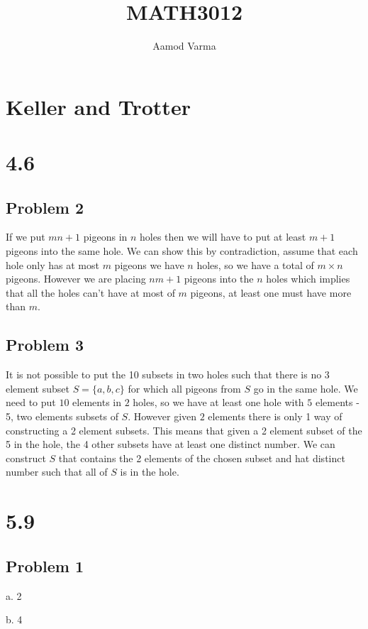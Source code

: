 \documentclass[a4paper]{report}
\title{MATH3012}
\author{Aamod Varma}
\begin{document}
\maketitle


\section*{Keller and Trotter}
\section*{4.6}
\subsection*{Problem 2}
If we put $mn + 1$ pigeons in  $n$ holes then we will have to put at least $m + 1$  pigeons into the same hole. We can show this by contradiction, assume that each hole only has at most $m$ pigeons we have  $n$ holes, so we have a total of $m \times  n$ pigeons. However we are placing $nm + 1$ pigeons into the  $n$ holes which implies that all the holes can't have at most of $m$ pigeons, at least one must have more than $m$.




\subsection*{Problem 3}
It is not possible to put the 10 subsets in two holes such that there is no $3$ element subset  $S = \{a,b,c\}$ for which all pigeons from  $S$ go in the same hole. We need to put $10$ elements in $2$ holes, so we have at least one hole with $5$ elements - 5, two elements subsets of  $S$. However given $2$ elements there is only 1 way of constructing a 2 element subsets. This means that given a 2 element subset of the 5 in the hole, the 4 other subsets have at least one distinct number. We can construct $S$ that contains the 2 elements of the chosen subset and hat distinct number such that all of $S$ is in the hole.
\section*{5.9}



\subsection*{Problem 1}
a. 2

b. 4
\end{document}
